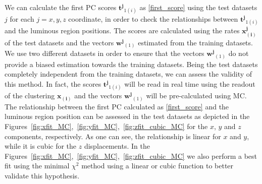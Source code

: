  We can calculate the first PC scores $\mathbf{t^j}_{1(i)}$ as \eqref{first_score} using the test datasets $j$ for each $j=x,y,z$ coordinate, in order to check the relationships between $\mathbf{t^{j}}_{1(i)}$ and the luminous region positions. The scores are calculated using the rates $\mathbf{x^{j}_{(i)}}$ of the test datasets and the vectors $\mathbf{w^{j}}_{(1)}$ estimated from the training datasets. We use two different datasets in order to ensure that the vectors $\mathbf{w^{j}}_{(1)}$ do not provide a biased estimation towards the training datasets. Being the test datasets completely independent from the training datasets, we can assess the validity of this method. In fact, the scores $\mathbf{t^{j}}_{1(i)}$ will be read in real time using the readout of the clustering $\mathbf{x_{(i)}}$ and the vectors $\mathbf{w^{j}}_{(1)}$ will be pre-calculated using MC. The relationship between the first PC calculated as \eqref{first_score} and the luminous region position can be assessed in the test datasets as depicted in the Figures~\ref{fig:xfit_MC},~\ref{fig:yfit_MC},~\ref{fig:zfit_cubic_MC} for the $x$, $y$ and $z$ components, respectively. As one can see, the relationship is linear for $x$ and $y$, while it is cubic for the $z$ displacements. In the Figures~\ref{fig:xfit_MC},~\ref{fig:yfit_MC},~\ref{fig:zfit_cubic_MC} we also perform a best fit using the minimal $\chi^2$ method using a linear or cubic function to better validate this hypothesis. 


